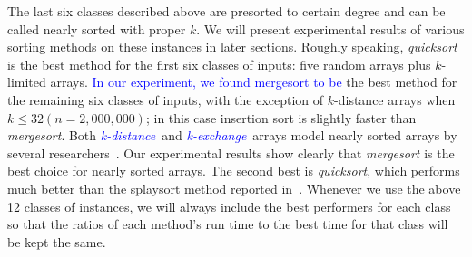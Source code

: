 \documentclass[AMA,STIX1COL]{WileyNJD-v2}
\newcommand{\kdis}{\textcolor{blue}{\emph{k-distance}}}
\newcommand{\kexc}{\textcolor{blue}{\emph{k-exchange}}}
\newcommand{\qusort}{\emph{quicksort }}
\newcommand{\qusortn}{\emph{quicksort}}
\newcommand{\msort}{\emph{mergesort }}
\newcommand{\msortn}{\emph{mergesort}}
\begin{document}
The last six classes described above are presorted to certain degree and can be called nearly sorted with proper $k$. 
We will present experimental results of various sorting methods on these instances in later sections.  
Roughly speaking, \qusort is the best method for the first six classes of inputs: five random arrays plus $k$-limited arrays. 
\textcolor{blue}{In our experiment, we found mergesort to be} the best method for the remaining six classes of inputs, with the exception of $k$-distance arrays when $k \leq 32 (n = 2,000,000)$; in this case insertion sort is slightly faster than \msortn. 
Both \kdis \ and \kexc \ arrays model nearly sorted arrays by several researchers~\cite{cook1980best}. 
Our experimental results show clearly that \msort is the best choice for nearly sorted arrays. 
The second best is \qusortn, which performs much better than the splaysort method reported in~\cite{moffat1996splaysort}. 
Whenever we use the above 12 classes of instances, we will always include the best performers for each class so that the ratios of each method’s run time to the best time for that class will be kept the same.             
\end{document}
